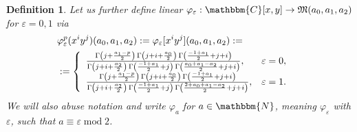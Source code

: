 \documentclass{article}
\newcommand{\assign}{:=}
\newcommand{\tmop}[1]{\ensuremath{\operatorname{#1}}}
\newtheorem{definition}[proposition]{Definition}
\theoremstyle{remark}
\begin{document}
\begin{definition}
  \label{intform:def-phi}Let us further define linear $\varphi_{\varepsilon} :
  \mathbbm{C} [x, y] \rightarrow \mathfrak{M} (a_0, a_1, a_2)$ for
  $\varepsilon = 0, 1$ via
  \begin{eqnarray}
    & \varphi_{\varepsilon}^p (x^i y^j) (a_0, a_1, a_2) \assign
    \varphi_{\varepsilon} [x^i y^j] (a_0, a_1, a_2) \assign &  \nonumber\\
    & : = \left\{ \begin{array}{ll}
      \frac{\Gamma \left( j + \frac{a_1 - p}{2} \right)  \hspace{0.17em}
      \Gamma \left( j + i + \frac{a_0}{2} \right)  \hspace{0.17em} \Gamma
      \left( \frac{- 1 + a_1}{2} + j + i \right)}{\Gamma \left( j + i +
      \frac{a_2}{2} \right)  \hspace{0.17em} \Gamma \left( \frac{- 1 + a_1}{2}
      + j \right)  \hspace{0.17em} \Gamma \left( \frac{a_0 + a_1 - a_2}{2} + j
      + i \right)}, & \varepsilon = 0,\\
      \frac{\Gamma \left( j + \frac{a_1 - p}{2} \right)  \hspace{0.17em}
      \Gamma \left( j + i + \frac{a_0}{2} \right)  \hspace{0.17em} \Gamma
      \left( \frac{- 1 + a_1}{2} + j + i \right)}{\Gamma \left( j + i +
      \frac{a_2}{2} \right)  \hspace{0.17em} \Gamma \left( \frac{- 1 + a_1}{2}
      + j \right)  \hspace{0.17em} \Gamma \left( \frac{2 + a_0 + a_1 - a_2}{2}
      + j + i \right)}, & \varepsilon = 1.
    \end{array} \right. &  \nonumber
  \end{eqnarray}
  We will also abuse notation and write $\varphi_a$ for $a \in \mathbbm{N}$,
  meaning $\varphi_{\varepsilon}$ with $\varepsilon$, such that $a \equiv
  \varepsilon \tmop{mod} 2$.
\end{definition}
\end{document}
